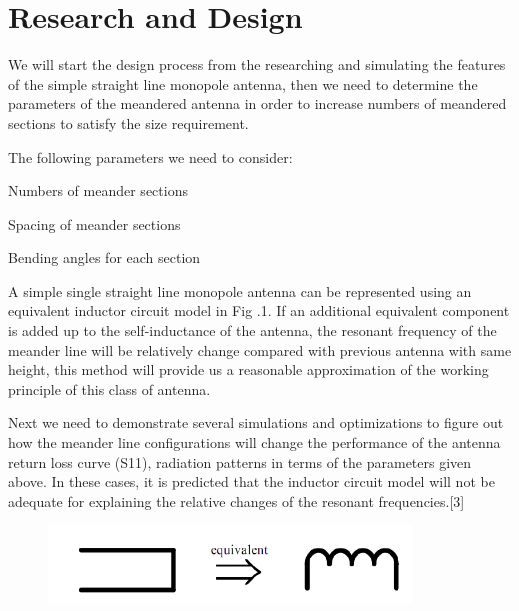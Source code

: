 \section{Research and Design}

We will start the design process from the researching and simulating the features of the simple straight line monopole antenna, then we need to determine the parameters of the meandered antenna in order to increase numbers of meandered sections to satisfy the size requirement.

The following parameters we need to consider:

\begin{itemize*}

  \item Numbers of meander sections
  \item Spacing of meander sections
  \item Bending angles for each section

\end{itemize*}

A simple single straight line monopole antenna can be represented using an equivalent inductor circuit model in Fig .1. If an additional equivalent component is added up to the self-inductance of the antenna, the resonant frequency of the meander line will be relatively change compared with previous antenna with same height, this method will provide us a reasonable approximation of the working principle of this class of antenna.

Next we need to demonstrate several simulations and optimizations to figure out how the meander line configurations will change the performance of the antenna return loss curve (S11), radiation patterns in terms of the parameters given above. In these cases, it is predicted that the inductor circuit model will not be adequate for explaining the relative changes of the resonant frequencies.[3]

\begin{figure}[h]
	\begin{center}
		\includegraphics[width=3.8in]{./images/efield_image1.png}
		\caption{}
		\label{fig:efield_fig1}
	\end{center}
\end{figure}


